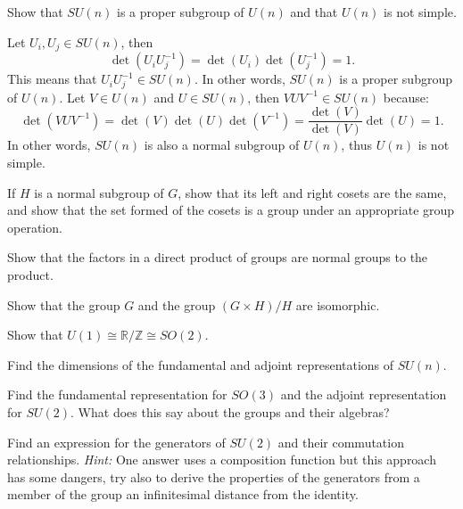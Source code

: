 \documentclass[notes.tex]{subfiles}
\begin{document}
\begin{Exercise}[]
Show that $SU(n)$ is a proper subgroup of $U(n)$ and that $U(n)$ is not simple.
\end{Exercise}

\begin{Answer}
Let $U_i, U_j \in SU(n)$, then 
\[\det(U_i U_j^{-1}) = \det(U_i)\det(U_j^{-1}) = 1.\]
This means that $U_i U^{-1}_j \in SU(n)$. In other words, $SU(n)$ is a proper subgroup of $U(n)$. Let $V \in U(n)$ and $U \in SU(n)$, then $VUV^{-1} \in SU(n)$ because:
\[\det(VUV^{-1}) = \det(V)\det(U)\det(V^{-1}) = \frac{\det(V)}{\det(V)} \det(U) = 1.\]
In other words, $SU(n)$ is also a normal subgroup of $U(n)$, thus $U(n)$ is not simple.
\end{Answer}

\begin{Exercise}[]
If $H$ is a normal subgroup of $G$, show that its left and right cosets are the same, and show that the set formed of the cosets is a group under an appropriate group operation.
\end{Exercise}

\begin{Exercise}[]
Show that the factors in a direct product of groups are normal groups to the product.
\end{Exercise}

\begin{Exercise}[]
Show that the group $G$ and the group $(G\times H) / H$ are isomorphic.
\end{Exercise}

\begin{Exercise}[]
Show that $U(1)\cong\mathbb{R}/\mathbb{Z}\cong SO(2)$.
\end{Exercise}

\begin{Exercise}[]
Find the dimensions of the fundamental and adjoint representations of $SU(n)$.
\end{Exercise}

\begin{Exercise}[]
Find the fundamental representation for $SO(3)$ and the adjoint representation for $SU(2)$. What does this say about the groups and their algebras?
\end{Exercise}

\begin{Exercise}[difficulty={3}]
Find an expression for the generators of $SU(2)$ and their commutation relationships. {\it Hint:} One answer uses a composition function but this approach has some dangers, try also to derive the properties of the generators from a member of the group an infinitesimal distance from the identity.
\end{Exercise}
\end{document}
